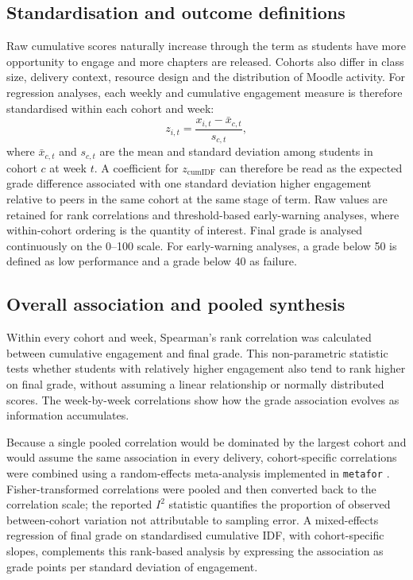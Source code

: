 \documentclass[11pt,a4paper]{article}
\begin{document}
\subsection{Standardisation and outcome definitions}
Raw cumulative scores naturally increase through the term as students have more
opportunity to engage and more chapters are released. Cohorts also differ in
class size, delivery context, resource design and the distribution of Moodle
activity. For regression analyses, each weekly and cumulative engagement measure
is therefore standardised within each cohort and week:
\[
z_{i,t} = \frac{x_{i,t} - \bar{x}_{c,t}}{s_{c,t}},
\]
where $\bar{x}_{c,t}$ and $s_{c,t}$ are the mean and standard deviation among
students in cohort $c$ at week $t$. A coefficient for $z_{\mathrm{cumIDF}}$ can
therefore be read as the expected grade difference associated with one standard
deviation higher engagement relative to peers in the same cohort at the same
stage of term. Raw values are retained for rank correlations and threshold-based
early-warning analyses, where within-cohort ordering is the quantity of
interest. Final grade is analysed continuously on the 0--100 scale. For
early-warning analyses, a grade below 50 is defined as low performance and a
grade below 40 as failure.

\subsection{Overall association and pooled synthesis}
Within every cohort and week, Spearman's rank correlation was calculated between
cumulative engagement and final grade. This non-parametric statistic tests
whether students with relatively higher engagement also tend to rank higher on
final grade, without assuming a linear relationship or normally distributed
scores. The week-by-week correlations show how the grade association evolves as
information accumulates.

Because a single pooled correlation would be dominated by the largest cohort and
would assume the same association in every delivery, cohort-specific correlations
were combined using a random-effects meta-analysis implemented in
\texttt{metafor} \citep{viechtbauer2010}. Fisher-transformed correlations were
pooled and then converted back to the correlation scale; the reported $I^2$
statistic quantifies the proportion of observed between-cohort variation not
attributable to sampling error. A mixed-effects regression of final grade on
standardised cumulative IDF, with cohort-specific slopes, complements this
rank-based analysis by expressing the association as grade points per standard
deviation of engagement.
\end{document}
